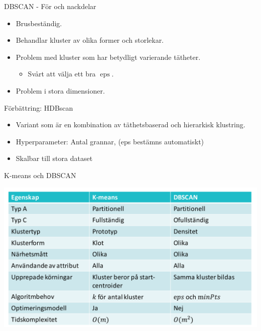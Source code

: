 \documentclass[10pt,english]{beamer}
\begin{document}
\begin{frame}{DBSCAN - För och nackdelar}

    \begin{itemize}
        \item Brusbeständig.
        \item Behandlar kluster av olika former och storlekar.
        \item Problem med kluster som har betydligt varierande tätheter.
        \begin{itemize}
            \item Svårt att välja ett bra $\operatorname{eps}$.
        \end{itemize}
        \item Problem i stora dimensioner.
    \end{itemize}
    
    Förbättring: HDBscan
    \begin{itemize}
        \item Variant som är en kombination av täthetsbaserad och hierarkisk klustring.
        \item Hyperparameter: Antal grannar, (eps bestämns automatiskt)
        \item Skalbar till stora dataset
    \end{itemize}
    
\end{frame}

\begin{frame}{K-means och DBSCAN}

    \includegraphics[width=\textwidth]{figs/compre_k-mean_DBACAN.png}
    
\end{frame}
\end{document}

